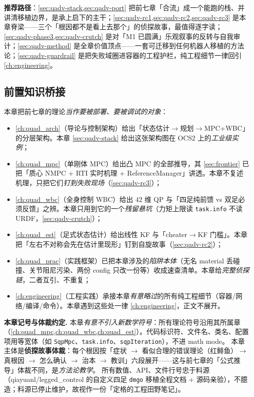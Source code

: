 \noindent\textbf{推荐路径}：\cref{sec:qadv-stack,sec:qadv-port} 把前七章「合流」成一个能跑的栈、并讲清移植边界，是承上启下的主干；\cref{sec:qadv-rc1,sec:qadv-rc2,sec:qadv-rc3} 是本章脊梁——三个「根因都不是看上去那个」的侦探故事，最值得逐字读；\cref{sec:qadv-phase3,sec:qadv-crutch} 是对「M1 已圆满」乐观叙事的反转与自我审计；\cref{sec:qadv-method} 是全章价值顶点——一套可迁移到任何机器人移植的方法论；\cref{sec:qadv-guardrail} 是把失败域圈进容器的工程护栏，纯工程细节一律回引 \cref{ch:engineering}。

\subsection*{前置知识桥接}
本章把前七章的理论\emph{当作要被部署、要被调试的对象}：
\begin{itemize}
  \item \cref{ch:quad_arch}（导论与控制架构）给出「状态估计$\to$规划$\to$MPC+WBC」的分层架构。本章 \cref{sec:qadv-stack} 给出这张架构图在 OCS2 上的\emph{工业级实例}；
  \item \cref{ch:quad_mpc}（单刚体 MPC）给出凸 MPC 的全部推导，其 \cref{sec:frontier} 已把「质心 NMPC + RTI 实时机理 + ReferenceManager」讲透。本章不复述机理，只把它们\emph{钉到失败现场}（\cref{sec:qadv-rc3}）；
  \item \cref{ch:quad_wbc}（全身控制 WBC）给出 $42$ 维 QP 与「四足纯前馈 vs 双足必须反馈」之辨。本章只用到它的一个\emph{残留悬坑}（力矩上限读 \texttt{task.info} 不读 URDF，\cref{sec:qadv-crutch}）；
  \item \cref{ch:quad_est}（足式状态估计）给出线性 KF 与「cheater$\to$KF 门槛」。本章把「左右不对称会先在估计里现形」钉到自旋故事（\cref{sec:qadv-rc2}）；
  \item \cref{ch:quad_prac}（实践框架）已把本章涉及的\emph{陷阱本体}（无名 material 丢碰撞、关节阻尼污染、两份 config 只改一份等）收成速查清单。本章给\emph{完整侦探链}，二者互引、不重复；
  \item \cref{ch:engineering}（工程实践）承接本章\emph{有意略过}的所有纯工程细节（容器/网络/编译/命令）。本章遇到这些处一律 \cref{ch:engineering}，正文不展开。
\end{itemize}

\begin{note}
\textbf{本章记号与体裁约定.}\;
本章\emph{有意不引入新数学符号}：所有理论符号沿用其所属章（\cref{ch:quad_mpc,ch:quad_wbc,ch:quad_est}）。代码标识符、文件名、类名、配置项用等宽体（如 \texttt{SqpMpc}、\texttt{task.info}、\texttt{sqpIteration}），不进 math mode。
本章主体是\textbf{侦探故事体裁}：每个根因按「症状 $\to$ 看似合理的错误理论（红鲱鱼）$\to$ 真根因 $\to$ 怎么确认 $\to$ 治本 $\to$ 教训」六段展开——这与前七章的「公式推导」体裁不同，是\emph{方法论教学}。
所有数值、API、文件行号忠于料源（qiayuanl/legged\_control 的自定义四足 \texttt{dmgo} 移植全程文档 + 源码亲验），不臆造；料源已停止维护，故视作一份「定格的工程田野笔记」。
\end{note}

